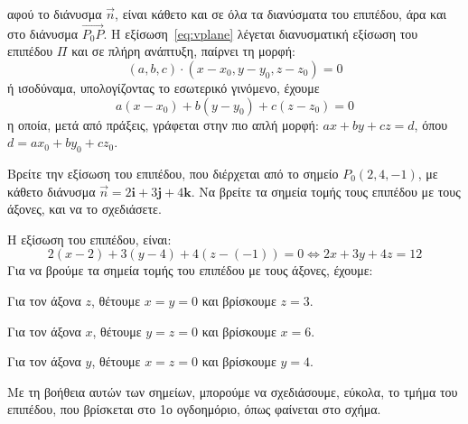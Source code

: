 αφού το διάνυσμα $ \vec{n} $, είναι κάθετο και σε όλα τα διανύσματα του επιπέδου, άρα 
και στο διάνυσμα $ \vec{P_{0}P} $. 
Η εξίσωση~\eqref{eq:vplane} λέγεται \textcolor{Col1}{διανυσματική} εξίσωση του 
επιπέδου $ \Pi $ και σε πλήρη ανάπτυξη, παίρνει τη μορφή:
\begin{equation*}
  (a,b,c) \cdot (x- x_{0}, y- y_{0}, z- z_{0}) = 0 
\end{equation*} 
ή ισοδύναμα, υπολογίζοντας το εσωτερικό γινόμενο, έχουμε
\begin{equation}
  \boxed{a(x- x_{0}) + b(y- y_{0}) + c(z- z_{0}) = 0}
\end{equation}
η οποία, μετά από πράξεις, γράφεται στην πιο απλή μορφή:
$ ax+by+cz=d $, όπου $ d=a x_{0}+ b y_{0}+cz_{0} $.



\begin{example}
  Βρείτε την εξίσωση του επιπέδου, που διέρχεται από το σημείο $ P_{0}(2,4,-1) $, με 
  κάθετο διάνυσμα $ \vec{n} = 2 \mathbf{i} + 3 \mathbf{j} + 4 \mathbf{k} $. Να βρείτε 
  τα σημεία τομής τους επιπέδου με τους άξονες, και να το σχεδιάσετε.
\end{example}
\begin{solution}
  Η εξίσωση του επιπέδου, είναι:
  \[
    2(x-2)+3(y-4)+4(z-(-1)) = 0 \Leftrightarrow 2x+3y+4z=12
  \]
  Για να βρούμε τα σημεία τομής του επιπέδου με τους άξονες, έχουμε:
  \begin{myitemize}
    \item Για τον άξονα $z$, θέτουμε $ x=y=0 $ και βρίσκουμε $ z=3 $.
    \item Για τον άξονα $x$, θέτουμε $ y=z=0 $ και βρίσκουμε $ x=6 $.
    \item Για τον άξονα $y$, θέτουμε $ x=z=0 $ και βρίσκουμε $ y=4 $.
  \end{myitemize}
  Με τη βοήθεια αυτών των σημείων, μπορούμε να σχεδιάσουμε, εύκολα, το τμήμα του 
  επιπέδου, που βρίσκεται στο 1ο ογδοημόριο, όπως φαίνεται στο σχήμα.
\end{solution}


